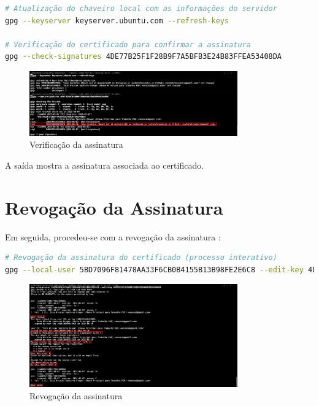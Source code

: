\begin{lstlisting}[language=bash]
# Atualização do chaveiro local com as informações do servidor
gpg --keyserver keyserver.ubuntu.com --refresh-keys

# Verificação do certificado para confirmar a assinatura
gpg --check-signatures 4DE77B25F1F28B9F7A5BFB3E24B83FFEA53408DA
\end{lstlisting}

\begin{figure}[htb]
    \centering
    \includegraphics[width=0.8\textwidth]{images/03-verificacao_assinatura.jpeg}
    \caption{Verificação da assinatura}
    \label{fig:verificacao-assinatura}
\end{figure}

A saída mostra a assinatura associada ao certificado.

\section{Revogação da Assinatura}
Em seguida, procedeu-se com a revogação da assinatura \cite{rfc4880}:

\begin{lstlisting}[language=bash]
# Revogação da assinatura do certificado (processo interativo)
gpg --local-user 5BD7096F81478AA33F6CB0B4155B13B98FE2E6C8 --edit-key 4DE77B25F1F28B9F7A5BFB3E24B83FFEA53408DA
\end{lstlisting}

\begin{figure}[htb]
    \centering
    \includegraphics[width=0.8\textwidth]{images/03-revogacao_assinatura.jpeg}
    \caption{Revogação da assinatura}
    \label{fig:revogacao-assinatura}
\end{figure}

